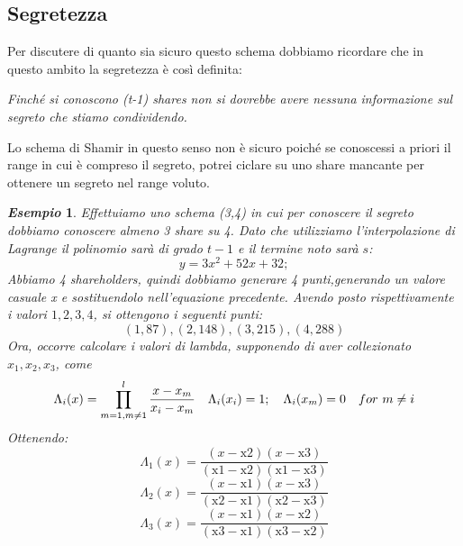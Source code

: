 \documentclass{book}
\newtheorem{esempio}{\emph{Esempio}}
\begin{document}
\subsection{Segretezza}
Per discutere di quanto sia sicuro questo schema dobbiamo ricordare che in questo ambito la segretezza è così definita:
\begin{center}
    \emph{Finché si conoscono (t-1) shares non si dovrebbe avere nessuna informazione sul segreto che stiamo condividendo.}
\end{center}
Lo schema di Shamir in questo senso non è sicuro poiché se conoscessi a priori il range in cui è compreso il segreto, potrei ciclare su uno share mancante per ottenere un segreto nel range voluto\@.
\begin{esempio}
    Effettuiamo uno schema (3,4) in cui per conoscere il segreto dobbiamo conoscere almeno 3 share su 4\@. Dato che utilizziamo l'interpolazione di Lagrange il polinomio sarà di grado \(t-1\) e il termine noto sarà \(s\):
    \begin{equation*}
        y=3 x^2+52 x+32;
    \end{equation*}
    Abbiamo 4 shareholders, quindi dobbiamo generare 4 punti,generando un valore casuale x e sostituendolo nell'equazione precedente. Avendo posto rispettivamente i valori \(1,2,3,4\), si ottengono i seguenti punti:
    \begin{equation*}
        (1,87),(2,148),(3,215),(4,288)
    \end{equation*}
    Ora, occorre calcolare i valori di lambda, supponendo di aver collezionato \(x_{1},x_{2},x_{3}\), come
    \begin{equation*}
        \centering
        \Lambda_{i}(x)=\prod_{m=1,m\neq1}^{l}{\frac{x-x_{m}}{x_{i}-x_{m}}}\quad \Lambda_{i}(x_{i})=1;\quad \Lambda_{i}(x_{m})=0\quad for\ m\neq i
    \end{equation*}
    Ottenendo:
    \begin{equation*}
        \Lambda_{1}(x)=\frac{(x-\text{x2}) (x-\text{x3}) }{(\text{x1}-\text{x2}) (\text{x1}-\text{x3}) }
    \end{equation*}
    \begin{equation*}
        \Lambda_{2}(x)=\frac{(x-\text{x1}) (x-\text{x3}) }{(\text{x2}-\text{x1}) (\text{x2}-\text{x3}) }
    \end{equation*}
    \begin{equation*}
        \Lambda_{3}(x)= \frac{(x-\text{x1}) (x-\text{x2}) }{(\text{x3}-\text{x1}) (\text{x3}-\text{x2}) }
    \end{equation*}

\end{esempio}
\end{document}
